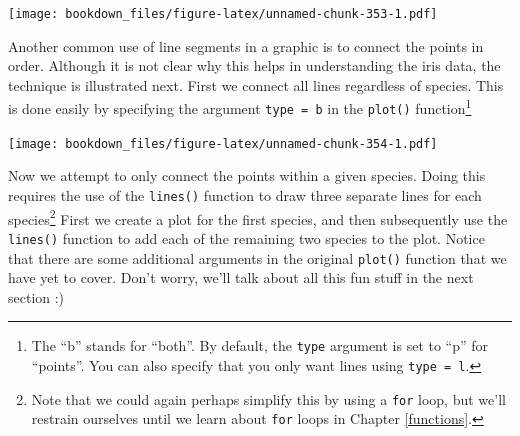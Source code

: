 \documentclass[]{krantz}
\makeatletter
\newenvironment{Shaded}{\begin{snugshade}}{\end{snugshade}}
\newcommand{\KeywordTok}[1]{\textcolor[rgb]{0.27,0.27,0.27}{\textbf{#1}}}
\newcommand{\DataTypeTok}[1]{\textcolor[rgb]{0.27,0.27,0.27}{#1}}
\newcommand{\DecValTok}[1]{\textcolor[rgb]{0.06,0.06,0.06}{#1}}
\newcommand{\FloatTok}[1]{\textcolor[rgb]{0.06,0.06,0.06}{#1}}
\newcommand{\StringTok}[1]{\textcolor[rgb]{0.5,0.5,0.5}{#1}}
\newcommand{\OperatorTok}[1]{\textcolor[rgb]{0.43,0.43,0.43}{\textbf{#1}}}
\newcommand{\NormalTok}[1]{#1}
\newenvironment{kframe}{%
\medskip{}
\setlength{\fboxsep}{.8em}
 \def\at@end@of@kframe{}%
 \ifinner\ifhmode%
  \def\at@end@of@kframe{\end{minipage}}%
  \begin{minipage}{\columnwidth}%
 \fi\fi%
 \def\FrameCommand##1{\hskip\@totalleftmargin \hskip-\fboxsep
 \colorbox{shadecolor}{##1}\hskip-\fboxsep
     \hskip-\linewidth \hskip-\@totalleftmargin \hskip\columnwidth}%
 \MakeFramed {\advance\hsize-\width
   \@totalleftmargin\z@ \linewidth\hsize
   \@setminipage}}%
 {\par\unskip\endMakeFramed%
 \at@end@of@kframe}
\renewenvironment{Shaded}{\begin{kframe}}{\end{kframe}}
\makeatother
\begin{document}
\texttt{[image: bookdown\_files/figure-latex/unnamed-chunk-353-1.pdf]}

Another common use of line segments in a graphic is to connect the
points in order. Although it is not clear why this helps in
understanding the iris data, the technique is illustrated next. First we
connect all lines regardless of species. This is done easily by
specifying the argument
\texttt{type\ =\ \textquotesingle{}b\textquotesingle{}} in the
\texttt{plot()} function\footnote{The ``b'' stands for ``both''. By
  default, the \texttt{type} argument is set to ``p'' for ``points''.
  You can also specify that you only want lines using
  \texttt{type\ =\ \textquotesingle{}l\textquotesingle{}}.}

\begin{Shaded}
\end{Shaded}

\texttt{[image: bookdown\_files/figure-latex/unnamed-chunk-354-1.pdf]}

Now we attempt to only connect the points within a given species. Doing
this requires the use of the \texttt{lines()} function to draw three
separate lines for each species\footnote{Note that we could again
  perhaps simplify this by using a \texttt{for} loop, but we'll restrain
  ourselves until we learn about \texttt{for} loops in Chapter
  \ref{functions}.} First we create a plot for the first species, and
then subsequently use the \texttt{lines()} function to add each of the
remaining two species to the plot. Notice that there are some additional
arguments in the original \texttt{plot()} function that we have yet to
cover. Don't worry, we'll talk about all this fun stuff in the next
section :)
\end{document}
